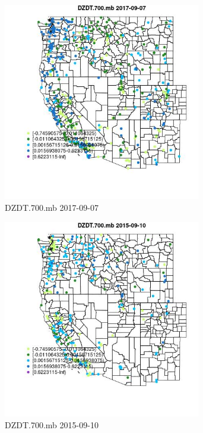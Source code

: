 \begin{figure} 
\centering  
\includegraphics[width=0.77\textwidth]{Code_Outputs/Report_ML_input_PM25_Step4_part_e_de_duplicated_aves_compiled_2019-05-21wNAs_MapObsDZDT700mb2017-09-07.jpg} 
\caption{\label{fig:Report_ML_input_PM25_Step4_part_e_de_duplicated_aves_compiled_2019-05-21wNAsMapObsDZDT700mb2017-09-07}DZDT.700.mb 2017-09-07} 
\end{figure} 
 

\begin{figure} 
\centering  
\includegraphics[width=0.77\textwidth]{Code_Outputs/Report_ML_input_PM25_Step4_part_e_de_duplicated_aves_compiled_2019-05-21wNAs_MapObsDZDT700mb2015-09-10.jpg} 
\caption{\label{fig:Report_ML_input_PM25_Step4_part_e_de_duplicated_aves_compiled_2019-05-21wNAsMapObsDZDT700mb2015-09-10}DZDT.700.mb 2015-09-10} 
\end{figure} 
 

